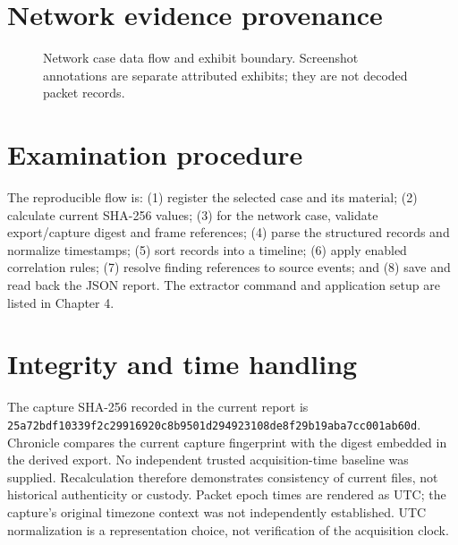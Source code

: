 \documentclass[12pt,a4paper]{report}
\begin{document}
\section{Network evidence provenance}
\begin{figure}[H]
\centering
{}
\caption{Network case data flow and exhibit boundary. Screenshot annotations are separate attributed exhibits; they are not decoded packet records.}
\end{figure}

\section{Examination procedure}
The reproducible flow is: (1) register the selected case and its material; (2) calculate current SHA-256 values; (3) for the network case, validate export/capture digest and frame references; (4) parse the structured records and normalize timestamps; (5) sort records into a timeline; (6) apply enabled correlation rules; (7) resolve finding references to source events; and (8) save and read back the JSON report. The extractor command and application setup are listed in Chapter 4.

\section{Integrity and time handling}
The capture SHA-256 recorded in the current report is \texttt{25a72bdf10339f2c29916920c8b9501d294923108de8f29b19aba7cc001ab60d}. Chronicle compares the current capture fingerprint with the digest embedded in the derived export. No independent trusted acquisition-time baseline was supplied. Recalculation therefore demonstrates consistency of current files, not historical authenticity or custody. Packet epoch times are rendered as UTC; the capture's original timezone context was not independently established. UTC normalization is a representation choice, not verification of the acquisition clock.
\end{document}
